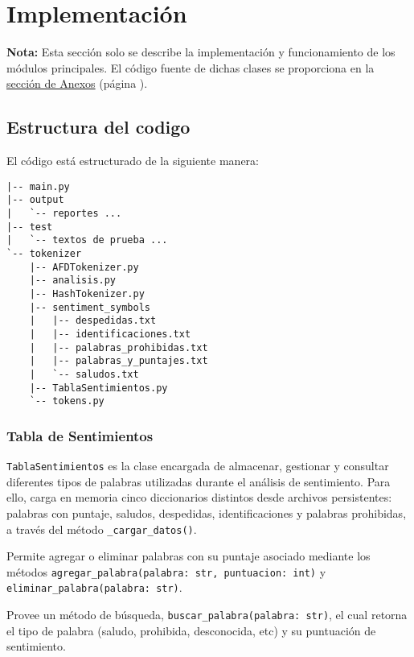 \section{Implementación}
\noindent\textbf{Nota:} Esta sección solo se describe la implementación y funcionamiento de los
módulos principales. El código fuente de dichas clases se proporciona en la
\hyperref[sec:Anexos]{sección de Anexos} (página \pageref{sec:Anexos}).

\subsection{Estructura del codigo}
El código está estructurado de la siguiente manera:

\begin{tcolorbox}[colback=gray!10, colframe=gray!80, sharp corners, boxrule=0.5pt]
	\begin{verbatim}
|-- main.py
|-- output
|   `-- reportes ...
|-- test
|   `-- textos de prueba ...
`-- tokenizer
    |-- AFDTokenizer.py
    |-- analisis.py
    |-- HashTokenizer.py
    |-- sentiment_symbols
    |   |-- despedidas.txt
    |   |-- identificaciones.txt
    |   |-- palabras_prohibidas.txt
    |   |-- palabras_y_puntajes.txt
    |   `-- saludos.txt
    |-- TablaSentimientos.py
    `-- tokens.py
\end{verbatim}
\end{tcolorbox}

\subsubsection{Tabla de Sentimientos}
\texttt{TablaSentimientos} es la clase encargada de almacenar, gestionar y consultar
diferentes tipos de palabras utilizadas durante el análisis de sentimiento. Para ello, carga en
memoria cinco diccionarios distintos desde archivos persistentes: palabras con puntaje,
saludos, despedidas, identificaciones y palabras prohibidas, a través del método \texttt{\_cargar\_datos()}.

Permite agregar o eliminar palabras con su puntaje asociado mediante los métodos
\texttt{agregar\_palabra(palabra: str, puntuacion: int)} y \texttt{eliminar\_palabra(palabra: str)}.

Provee un método de búsqueda, \texttt{buscar\_palabra(palabra: str)}, el cual retorna el tipo
de palabra (saludo, prohibida, desconocida, etc) y su puntuación de sentimiento.

